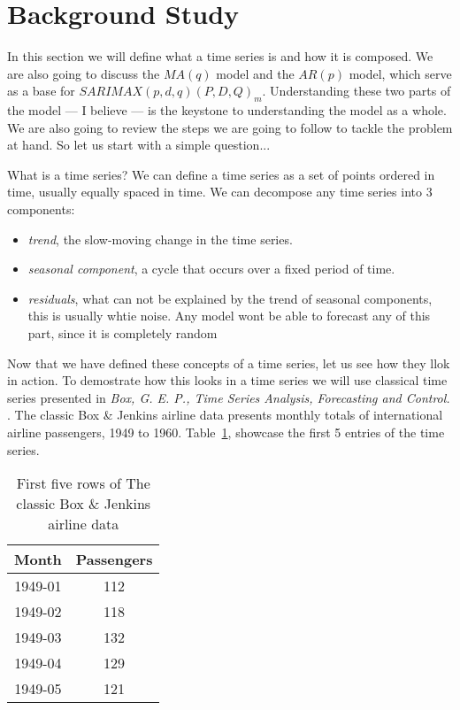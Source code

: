 \documentclass[journal]{IEEEtran}
\begin{document}
\section{Background Study}
In this section we will define what a time series is and how it is composed.
We are also going to discuss the $MA(q)$ model and the $AR(p)$ model, which
serve as a base for $SARIMAX(p,d,q)(P,D,Q)_m$. Understanding these two parts
of the model --- I believe --- is the keystone to understanding the model as a
whole. We are also going to review the steps we are going to follow to tackle
the problem at hand. So let us start with a simple question...

What is a time series? We can define a time series as a set of points ordered
in time, usually equally spaced in time. \cite{timeseries} We can decompose
any time series into 3 components:

\begin{itemize}
    \item \emph{trend}, the slow-moving change in the time series.

    \item \emph{seasonal component}, a cycle that occurs over a fixed period
        of time.

    \item \emph{residuals}, what can not be explained by the trend of seasonal
        components, this is usually whtie noise. Any model wont be able to
        forecast any of this part, since it is completely random
\end{itemize}

Now that we have defined these concepts of a time series, let us see how they
llok in action. To demostrate how this looks in a time series we will use
classical time series presented in \emph{Box, G. E. P., Time Series Analysis,
Forecasting and Control.} \cite{airline}. The classic Box \& Jenkins airline
data presents monthly totals of international airline passengers, 1949 to
1960. Table~\ref{tab:passengerdata}, showcase the first 5 entries of the time
series.

\begin{table}[htbp]
  \centering
  \caption{First five rows of The classic Box \& Jenkins airline data}
  \label{tab:passengerdata}
  \begin{tabular}{|c|c|}
    \hline
    Month    & Passengers \\
    \hline
    1949-01  & 112        \\
    1949-02  & 118        \\
    1949-03  & 132        \\
    1949-04  & 129        \\
    1949-05  & 121        \\
    \hline
  \end{tabular}
\end{table}
\end{document}
